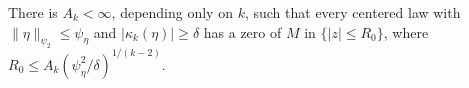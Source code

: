 There is \(A_k<\infty\), depending only on \(k\), such that every centered law with \(\|\eta\|_{\psi_2}\le\psi_{\eta}\) and \(|\kappa_k(\eta)|\ge\delta\) has a zero of \(M\) in \(\{|z|\le R_0\}\), where \(R_0\le A_k(\psi_{\eta}^2/\delta)^{1/(k-2)}\).